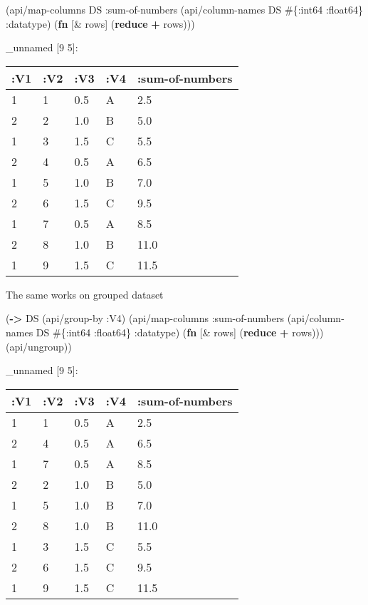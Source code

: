 \documentclass[]{article}
\newenvironment{Shaded}{\begin{snugshade}}{\end{snugshade}}
\newcommand{\AttributeTok}[1]{\textcolor[rgb]{0.77,0.63,0.00}{#1}}
\newcommand{\KeywordTok}[1]{\textcolor[rgb]{0.13,0.29,0.53}{\textbf{#1}}}
\newcommand{\NormalTok}[1]{#1}
\begin{document}
\begin{Shaded}
\begin{Highlighting}[]
\NormalTok{(api/map-columns DS}
                 \AttributeTok{:sum-of-numbers}
\NormalTok{                 (api/column-names DS  #\{}\AttributeTok{:int64} \AttributeTok{:float64}\NormalTok{\} }\AttributeTok{:datatype}\NormalTok{)}
\NormalTok{                 (}\KeywordTok{fn}\NormalTok{ [& rows]}
\NormalTok{                   (}\KeywordTok{reduce} \KeywordTok{+}\NormalTok{ rows)))}
\end{Highlighting}
\end{Shaded}

\_unnamed {[}9 5{]}:

\begin{longtable}[]{@{}lllll@{}}
\toprule
:V1 & :V2 & :V3 & :V4 & :sum-of-numbers\tabularnewline
\midrule
\endhead
1 & 1 & 0.5 & A & 2.5\tabularnewline
2 & 2 & 1.0 & B & 5.0\tabularnewline
1 & 3 & 1.5 & C & 5.5\tabularnewline
2 & 4 & 0.5 & A & 6.5\tabularnewline
1 & 5 & 1.0 & B & 7.0\tabularnewline
2 & 6 & 1.5 & C & 9.5\tabularnewline
1 & 7 & 0.5 & A & 8.5\tabularnewline
2 & 8 & 1.0 & B & 11.0\tabularnewline
1 & 9 & 1.5 & C & 11.5\tabularnewline
\bottomrule
\end{longtable}

The same works on grouped dataset

\begin{Shaded}
\begin{Highlighting}[]
\NormalTok{(}\KeywordTok{->}\NormalTok{ DS}
\NormalTok{    (api/group-by }\AttributeTok{:V4}\NormalTok{)}
\NormalTok{    (api/map-columns }\AttributeTok{:sum-of-numbers}
\NormalTok{                     (api/column-names DS  #\{}\AttributeTok{:int64} \AttributeTok{:float64}\NormalTok{\} }\AttributeTok{:datatype}\NormalTok{)}
\NormalTok{                     (}\KeywordTok{fn}\NormalTok{ [& rows]}
\NormalTok{                       (}\KeywordTok{reduce} \KeywordTok{+}\NormalTok{ rows)))}
\NormalTok{    (api/ungroup))}
\end{Highlighting}
\end{Shaded}

\_unnamed {[}9 5{]}:

\begin{longtable}[]{@{}lllll@{}}
\toprule
:V1 & :V2 & :V3 & :V4 & :sum-of-numbers\tabularnewline
\midrule
\endhead
1 & 1 & 0.5 & A & 2.5\tabularnewline
2 & 4 & 0.5 & A & 6.5\tabularnewline
1 & 7 & 0.5 & A & 8.5\tabularnewline
2 & 2 & 1.0 & B & 5.0\tabularnewline
1 & 5 & 1.0 & B & 7.0\tabularnewline
2 & 8 & 1.0 & B & 11.0\tabularnewline
1 & 3 & 1.5 & C & 5.5\tabularnewline
2 & 6 & 1.5 & C & 9.5\tabularnewline
1 & 9 & 1.5 & C & 11.5\tabularnewline
\bottomrule
\end{longtable}
\end{document}
